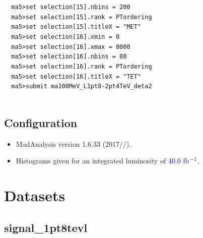 \documentclass[a4paper, 10pt]{article}
\begin{document}
\texttt{ }\texttt{ }\texttt{ma5>set selection[15].nbins = 200\\
}
\texttt{ }\texttt{ }\texttt{ma5>set selection[15].rank = PTordering\\
}
\texttt{ }\texttt{ }\texttt{ma5>set selection[15].titleX = "MET"\\
}
\texttt{ }\texttt{ }\texttt{ma5>set selection[16].xmin = 0\\
}
\texttt{ }\texttt{ }\texttt{ma5>set selection[16].xmax = 8000\\
}
\texttt{ }\texttt{ }\texttt{ma5>set selection[16].nbins = 80\\
}
\texttt{ }\texttt{ }\texttt{ma5>set selection[16].rank = PTordering\\
}
\texttt{ }\texttt{ }\texttt{ma5>set selection[16].titleX = "TET"\\
}
\texttt{ }\texttt{ }\texttt{ma5>submit ma100MeV\_L1pt8-2pt4TeV\_deta2\\
}
\texttt{ }\texttt{ }\subsection{ Configuration}

\begin{itemize}
  \item MadAnalysis version 1.6.33 (2017//).
   \item Histograms given for an integrated luminosity of \textcolor{blue}{40.0}\textcolor{blue}{ fb}$^{\textcolor{blue}{-1}}$\textcolor{blue}{.}
\textcolor{blue}{}
\end{itemize}
\newpage
\section{ Datasets}

\subsection{ signal\_1pt8tevl}
\end{document}
